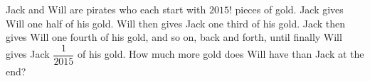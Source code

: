 Jack and Will are pirates who each start with $2015!$ pieces of gold. Jack gives Will one half of his gold. Will then gives Jack one third of his gold. Jack then gives Will one fourth of his gold, and so on, back and forth, until finally Will gives Jack $\dfrac{1}{2015}$ of his gold. How much more gold does Will have than Jack at the end?
